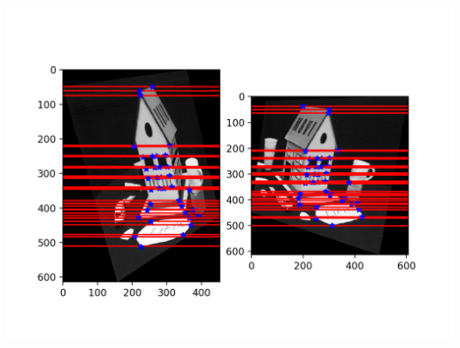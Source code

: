 \documentclass[11pt]{article}
\begin{document}
\includegraphics{Sample_rectification.png}
\end{document}
